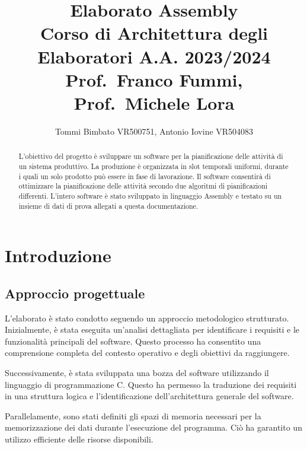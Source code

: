 \documentclass[a4paper]{report}
\author{Tommi Bimbato VR500751, Antonio Iovine VR504083}
\title{Elaborato Assembly \\ \normalsize Corso di Architettura degli Elaboratori A.A. 2023/2024 \\ Prof.\ Franco Fummi, Prof.\ Michele Lora}
\begin{document}
\begin{titlepage}
    \maketitle
\end{titlepage}

\thispagestyle{empty} %

\tableofcontents %

\begin{abstract}

  L'obiettivo del progetto è sviluppare un software per la pianificazione delle attività di un sistema produttivo.
  La produzione è organizzata in slot temporali uniformi, durante i quali un solo prodotto può essere in fase di lavorazione. 
  Il software consentirà di ottimizzare la pianificazione delle attività secondo due algoritmi di pianificazioni differenti.
  L'intero software è stato sviluppato in linguaggio Assembly e testato su un insieme di dati di prova allegati a questa documentazione.

\end{abstract}

\chapter{Introduzione}
\section{Approccio progettuale}
L'elaborato è stato condotto seguendo un approccio metodologico strutturato.
Inizialmente, è stata eseguita un'analisi dettagliata per identificare i requisiti
e le funzionalità principali del software. Questo processo ha consentito
una comprensione completa del contesto operativo e degli obiettivi da raggiungere.

Successivamente, è stata sviluppata una bozza del software utilizzando il linguaggio
di programmazione C. Questo ha permesso la traduzione dei requisiti in
una struttura logica e l'identificazione dell'architettura generale del software.

Parallelamente, sono stati definiti gli spazi di memoria necessari
per la memorizzazione dei dati durante l'esecuzione del programma.
Ciò ha garantito un utilizzo efficiente delle risorse disponibili.
\end{document}
